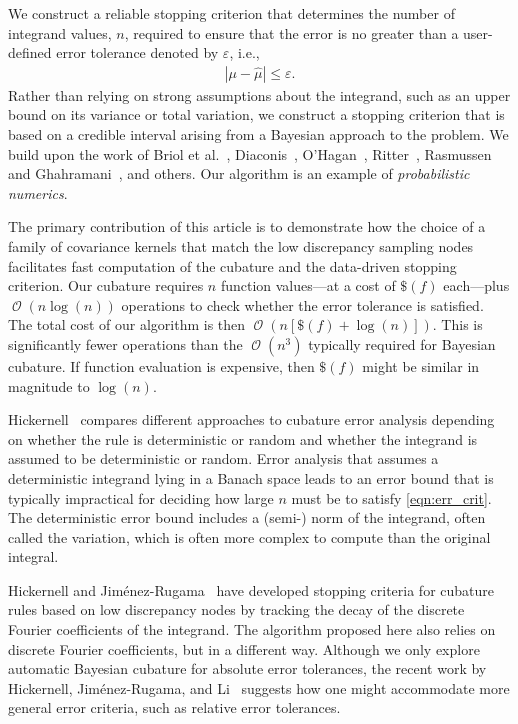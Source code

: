 \documentclass[twocolumn]{svjour3}          %
\DeclareMathOperator{\Order}{{\mathcal O}}
\newcommand{\hmu}{\widehat{\mu}}
\newcommand{\errtol}{\varepsilon}
\def\abs#1{\ensuremath{\left \lvert #1 \right \rvert}}
\begin{document}
We construct a reliable stopping criterion that determines the number of integrand values, $n$, required to ensure that the error is no greater than a user-defined error tolerance denoted by $\varepsilon$, i.e., 
\begin{align}
\label{eqn:err_crit} 
\abs{\mu - \hmu} \leq \errtol .
\end{align}
Rather than relying on strong assumptions about the integrand, such as an upper bound on its variance or total variation, we construct a stopping criterion that is based on a credible interval arising from a Bayesian approach to the problem.  We build upon the work of Briol et al.~\cite{BriEtal18a}, Diaconis~\cite{Dia88a}, O'Hagan~\cite{OHa91a}, Ritter~\cite{Rit00a}, Rasmussen and Ghahramani~\cite{RasGha03a}, and others.  Our algorithm is an example of \emph{probabilistic numerics}.

The primary contribution of this article is to demonstrate how the choice of a family of covariance kernels that match the low discrepancy sampling nodes facilitates fast computation of the cubature and the data-driven stopping criterion.  Our cubature requires $n$ function values---at a cost of $\$(f)$ each---plus $\Order(n \log(n))$ operations to check whether the error tolerance is satisfied.  The total cost of our algorithm is then $\Order(n [\$(f) + \log(n)])$.  This is significantly fewer operations than the $\Order(n^3)$ typically required for Bayesian cubature.  If function evaluation is expensive, then $\$(f)$ might be similar in magnitude to $\log(n)$.

Hickernell~\cite{Hic17a} compares different approaches to cubature error analysis depending on whether the rule is deterministic or random and whether the integrand is assumed to be deterministic or random.  Error analysis that assumes a deterministic integrand lying in a Banach space leads to an error bound that is typically impractical for deciding how large $n$ must be to satisfy \eqref{eqn:err_crit}.  The deterministic error bound includes a (semi-) norm of the integrand, often called the variation, which is often more complex to compute than the original integral.

Hickernell and Jim\'enez-Rugama~\cite{HicJim16a,JimHic16a} have developed stopping criteria for cubature rules based on low discrepancy nodes by tracking the decay of the discrete Fourier coefficients of the integrand.  The algorithm proposed here also relies on discrete Fourier coefficients, but in a different way.  Although we only explore automatic Bayesian cubature for absolute error tolerances, the recent work by Hickernell, Jim\'enez-Rugama, and Li~\cite{HicEtal17a} suggests how one might accommodate more general error criteria, such as relative error tolerances.
\end{document}
